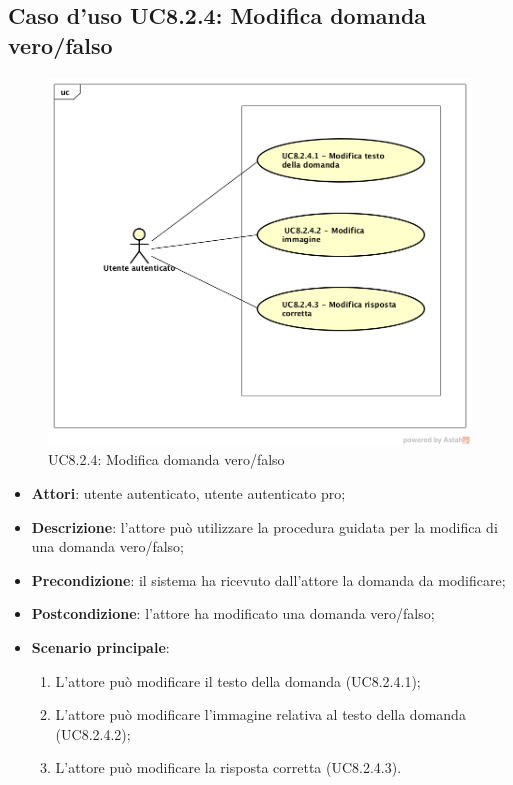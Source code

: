 \subsection{Caso d'uso UC8.2.4: Modifica domanda vero/falso}
	\label{UC8.2.4}
	\begin{figure}[h]
		\centering
			\includegraphics[scale=0.45,keepaspectratio]{UML/UC8_2_4.png}
		\caption{UC8.2.4: Modifica domanda vero/falso}
	\end{figure}
	\FloatBarrier
	\begin{itemize}
		\item
			\textbf{Attori}: utente autenticato, utente autenticato pro;
		\item		
			\textbf{Descrizione}: l'attore può utilizzare la procedura guidata per la modifica di una domanda vero/falso;
		\item
			\textbf{Precondizione}: il sistema ha ricevuto dall'attore la domanda da modificare;  
		\item
			\textbf{Postcondizione}: l'attore ha modificato una domanda vero/falso;
		\item
			\textbf{Scenario principale}:
	       		\begin{enumerate}
	       			\item
	       			L'attore può modificare il testo della domanda (UC8.2.4.1);
	       			\item
	       			L'attore può modificare l'immagine relativa al testo della domanda (UC8.2.4.2);
					\item
					L'attore può modificare la risposta corretta (UC8.2.4.3).
	 			\end{enumerate}
	\end{itemize}
	
